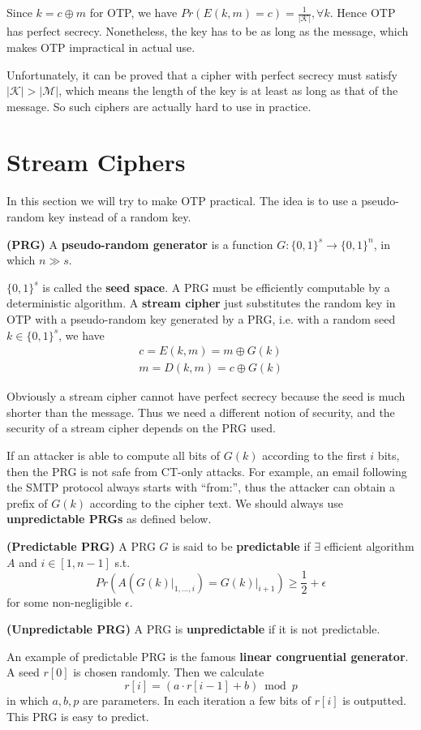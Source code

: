 Since $k=c\oplus m$ for OTP, we have $Pr(E(k,m)=c)=\frac{1}{\lvert\mathcal{K}\rvert},\forall k$. Hence OTP has perfect secrecy. Nonetheless, the key has to be as long as the message, which makes OTP impractical in actual use. 

Unfortunately, it can be proved that a cipher with perfect secrecy must satisfy $\lvert\mathcal{K}\rvert>\lvert\mathcal{M}\rvert$, which means the length of the key is at least as long as that of the message. So such ciphers are actually hard to use in practice.
\section{Stream Ciphers}
In this section we will try to make OTP practical. The idea is to use a pseudo-random key instead of a random key. 
\begin{definition}\textbf{(PRG)}
A \textbf{pseudo-random generator} is a function $G:\{0,1\}^s\rightarrow\{0,1\}^n$, in which $n\gg s$. 
\end{definition}
$\{0,1\}^s$ is called the \textbf{seed space}. A PRG must be efficiently computable by a deterministic algorithm. A \textbf{stream cipher} just substitutes the random key in OTP with a pseudo-random key generated by a PRG, i.e. with a random seed $k\in\{0,1\}^s$, we have
\begin{align*}
c=E(k,m)=m\oplus G(k)\\
m=D(k,m)=c\oplus G(k)
\end{align*}

Obviously a stream cipher cannot have perfect secrecy because the seed is much shorter than the message. Thus we need a different notion of security, and the security of a stream cipher depends on the PRG used. 

If an attacker is able to compute all bits of $G(k)$ according to the first $i$ bits, then the PRG is not safe from CT-only attacks. For example, an email following the SMTP protocol always starts with ``from:'', thus the attacker can obtain a prefix of $G(k)$ according to the cipher text. We should always use \textbf{unpredictable PRGs} as defined below.
\begin{definition}\textbf{(Predictable PRG)}
A PRG $G$ is said to be \textbf{predictable} if $\exists$ efficient algorithm $A$ and $i\in[1,n-1]$ s.t. 
\begin{equation*}
Pr\left(A\left(\left.G(k)\right\vert_{1,\dots,i}\right)=\left.G(k)\right\vert_{i+1}\right)\geq\frac{1}{2}+\epsilon
\end{equation*}
for some non-negligible $\epsilon$. 
\end{definition}
\begin{definition}\textbf{(Unpredictable PRG)}
A PRG is \textbf{unpredictable} if it is not predictable. 
\end{definition}
An example of predictable PRG is the famous \textbf{linear congruential generator}. A seed $r[0]$ is chosen randomly. Then we calculate
\begin{equation*}
r[i]=(a\cdot r[i-1]+b)\bmod p
\end{equation*}
in which $a,b,p$ are parameters. In each iteration a few bits of $r[i]$ is outputted. This PRG is easy to predict. 

